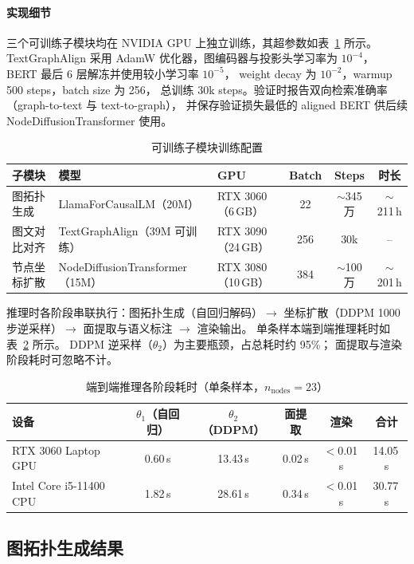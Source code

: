 \paragraph{实现细节}
三个可训练子模块均在 NVIDIA GPU 上独立训练，其超参数如表~\ref{tab:impl} 所示。
TextGraphAlign 采用 AdamW 优化器，图编码器与投影头学习率为 $10^{-4}$，
BERT 最后 6 层解冻并使用较小学习率 $10^{-5}$，
weight decay 为 $10^{-2}$，warmup 500 steps，batch size 为 256，
总训练 30k steps。验证时报告双向检索准确率（graph-to-text 与 text-to-graph），
并保存验证损失最低的 aligned BERT 供后续 NodeDiffusionTransformer 使用。

\begin{table}[h]
\centering
\caption{可训练子模块训练配置}
\label{tab:impl}
\small
\begin{tabular}{lllccc}
\toprule
子模块 & 模型 & GPU & Batch & Steps & 时长 \\
\midrule
图拓扑生成     & LlamaForCausalLM（20M）          & RTX 3060（6\,GB）  & 22  & $\sim$345万 & $\sim$211\,h \\
图文对比对齐   & TextGraphAlign（39M 可训练）     & RTX 3090（24\,GB） & 256 & 30k          & -- \\
节点坐标扩散   & NodeDiffusionTransformer（15M）  & RTX 3080（10\,GB） & 384 & $\sim$100万 & $\sim$201\,h  \\
\bottomrule
\end{tabular}
\end{table}

推理时各阶段串联执行：图拓扑生成（自回归解码）$\to$
坐标扩散（DDPM 1000 步逆采样）$\to$ 面提取与语义标注 $\to$ 渲染输出。
单条样本端到端推理耗时如表~\ref{tab:latency} 所示。
DDPM 逆采样（$\theta_2$）为主要瓶颈，占总耗时约 95\%；
面提取与渲染阶段耗时可忽略不计。

\begin{table}[h]
\centering
\caption{端到端推理各阶段耗时（单条样本，$n_{\text{nodes}}=23$）}
\label{tab:latency}
\small
\begin{tabular}{lcccc|c}
\toprule
设备 & $\theta_1$（自回归） & $\theta_2$（DDPM） & 面提取 & 渲染 & 合计 \\
\midrule
RTX 3060 Laptop GPU   & 0.60\,s & 13.43\,s & 0.02\,s & $<$0.01\,s & 14.05\,s \\
Intel Core i5-11400 CPU & 1.82\,s & 28.61\,s & 0.34\,s & $<$0.01\,s & 30.77\,s \\
\bottomrule
\end{tabular}
\end{table}

\subsection{图拓扑生成结果}
\label{subsec:topology_results}
\label{subsec:main_results}

